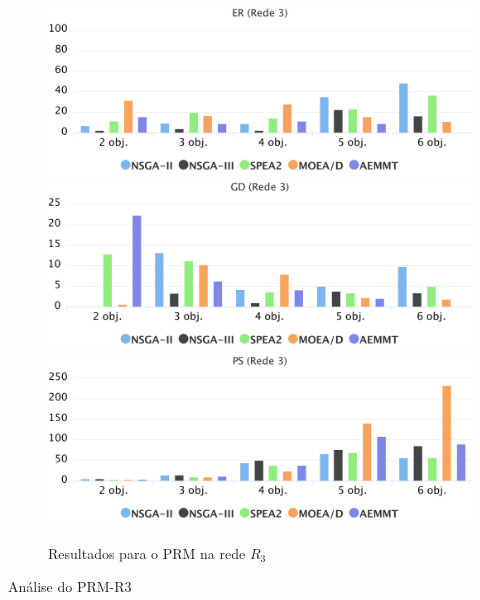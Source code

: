 \begin{figure}[!htbp]
	\caption{Resultados para o PRM na rede $R_3$}
	\label{fig_exp1_mrp_r3}
	\includegraphics[width=1\textwidth]{cap_experimentos/figs/er-mrp-r3}
	\includegraphics[width=1\textwidth]{cap_experimentos/figs/gd-mrp-r3}
	\includegraphics[width=1\textwidth]{cap_experimentos/figs/ps-mrp-r3}
\end{figure}

Análise do PRM-R3

